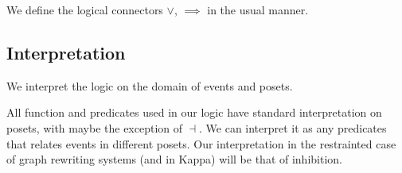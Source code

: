 We define the logical connectors $\vee$, $\implies$ in the usual manner.

\subsection{Interpretation}

We interpret the logic on the domain of events and posets.

All function and predicates used in our logic have standard interpretation on posets, with maybe the exception of $\dashv$. We can interpret it as any predicates that relates events in different posets. Our interpretation in the restrainted case of graph rewriting systems (and in Kappa) will be that of inhibition.

